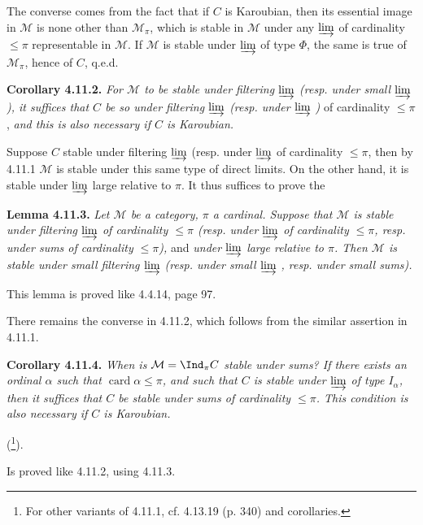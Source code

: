 The converse comes from the fact that if $C$ is Karoubian, then its essential image in $\mathcal{M}$ is none other than $\mathcal{M}_\pi$, which is stable in $\mathcal{M}$ under any $\varinjlim$ of cardinality $\leqslant \pi$ representable in $\mathcal{M}$. If $\mathcal{M}$ is stable under $\varinjlim$ of type $\Phi$, the same is true of $\mathcal{M}_\pi$, hence of $C$, q.e.d.

\textbf{Corollary 4.11.2.} \textit{For $\mathcal{M}$ to be stable under filtering $\varinjlim$ (resp. under small $\varinjlim$ ), it suffices that $C$ be so under filtering $\varinjlim$ (resp. under $\varinjlim$ )} of cardinality $\leqslant \pi$, \textit{and this is also necessary if $C$ is Karoubian.}

Suppose $C$ stable under filtering $\varinjlim$  (resp. under $\varinjlim$ of cardinality $\leqslant \pi$, then by 4.11.1 $\mathcal{M}$ is stable under this same type of direct limits. On the other hand, it is stable under $\varinjlim$ large relative to $\pi$. It thus suffices to prove the

\textbf{Lemma 4.11.3.} \textit{Let $\mathcal{M}$ be a category, $\pi$ a cardinal. Suppose that $\mathcal{M}$ is stable under filtering $\varinjlim$ of cardinality $\leqslant \pi$ (resp. under $\varinjlim$ of cardinality $\leqslant \pi$, resp. under sums of cardinality $\leqslant \pi$),} and \textit{under $\varinjlim$ large relative to $\pi$. Then $\mathcal{M}$ is stable under small filtering $\varinjlim$ (resp. under small $\varinjlim$ , resp. under small sums).} %

This lemma is proved like 4.4.14, page 97.

There remains the converse in 4.11.2, which follows from the similar assertion in 4.11.1.

\textbf{Corollary 4.11.4.} \textit{When is $\mathcal{M} = \Ind_\pi C$ stable under sums? If there exists an ordinal $\alpha$ such that $\operatorname{card}\alpha \leqslant \pi$, and such that $C$ is stable under $\varinjlim$ of type $I_\alpha$, then it suffices that $C$ be stable under sums of cardinality $\leqslant \pi$. This condition is also necessary if $C$ is Karoubian.}

(\footnote{For other variants of 4.11.1, cf. 4.13.19 (p. 340) and corollaries.}).

Is proved like 4.11.2, using 4.11.3.


